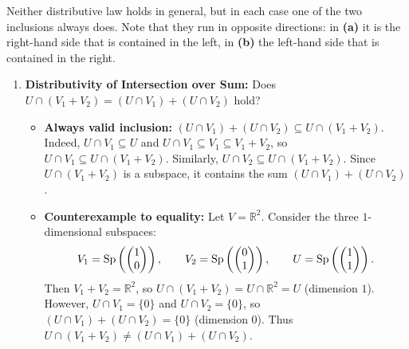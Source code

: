 \begin{exercisesolution*}
\label{sol:subspaces_distributivity}
Neither distributive law holds in general, but in each case one of the two inclusions always does. Note that they run in opposite directions: in \textbf{(a)} it is the right-hand side that is contained in the left, in \textbf{(b)} the left-hand side that is contained in the right.

\begin{enumerate}[label=\textbf{(\alph*)}]
    \item \textbf{Distributivity of Intersection over Sum:}
    Does $U \cap (V_1 + V_2) = (U \cap V_1) + (U \cap V_2)$ hold?
    \begin{itemize}
        \item \textbf{Always valid inclusion:} $(U \cap V_1) + (U \cap V_2) \subseteq U \cap (V_1 + V_2)$.
        Indeed, $U \cap V_1 \subseteq U$ and $U \cap V_1 \subseteq V_1 \subseteq V_1 + V_2$, so $U \cap V_1 \subseteq U \cap (V_1 + V_2)$. Similarly, $U \cap V_2 \subseteq U \cap (V_1 + V_2)$. Since $U \cap (V_1 + V_2)$ is a subspace, it contains the sum $(U \cap V_1) + (U \cap V_2)$.
        \item \textbf{Counterexample to equality:} Let $V = \mathbb{R}^2$. Consider the three $1$-dimensional subspaces:
        \[
        V_1 = \operatorname{Sp}\left(\begin{pmatrix} 1 \\ 0 \end{pmatrix}\right), \qquad V_2 = \operatorname{Sp}\left(\begin{pmatrix} 0 \\ 1 \end{pmatrix}\right), \qquad U = \operatorname{Sp}\left(\begin{pmatrix} 1 \\ 1 \end{pmatrix}\right).
        \]
        Then $V_1 + V_2 = \mathbb{R}^2$, so $U \cap (V_1 + V_2) = U \cap \mathbb{R}^2 = U$ (dimension $1$).
        However, $U \cap V_1 = \{0\}$ and $U \cap V_2 = \{0\}$, so $(U \cap V_1) + (U \cap V_2) = \{0\}$ (dimension $0$).
        Thus $U \cap (V_1 + V_2) \ne (U \cap V_1) + (U \cap V_2)$.
    \end{itemize}


\end{enumerate}
\end{exercisesolution*}
